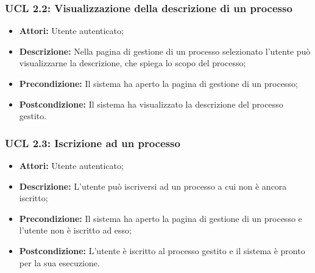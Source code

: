 \subsubsection{UCL 2.2: Visualizzazione della descrizione di un processo}
\begin{itemize}
\item \textbf{Attori:} Utente autenticato;
\item \textbf{Descrizione:} Nella pagina di gestione di un processo selezionato l'utente può visualizzarne la descrizione, che spiega lo scopo del processo;
\item \textbf{Precondizione:} Il sistema ha aperto la pagina di gestione di un processo;
\item \textbf{Postcondizione:} Il sistema ha visualizzato la descrizione del processo gestito.
\end{itemize}

\hypertarget{L2.3}{}
\subsubsection{UCL 2.3: Iscrizione ad un processo}
\begin{itemize}
\item \textbf{Attori:} Utente autenticato;
\item \textbf{Descrizione:} L'utente può iscriversi ad un processo a cui non è ancora iscritto;
\item \textbf{Precondizione:} Il sistema ha aperto la pagina di gestione di un processo e l'utente non è iscritto ad esso;
\item \textbf{Postcondizione:} L'utente è iscritto al processo gestito e il sistema è pronto per la sua esecuzione.
\end{itemize}

\hypertarget{L2.4}{}
